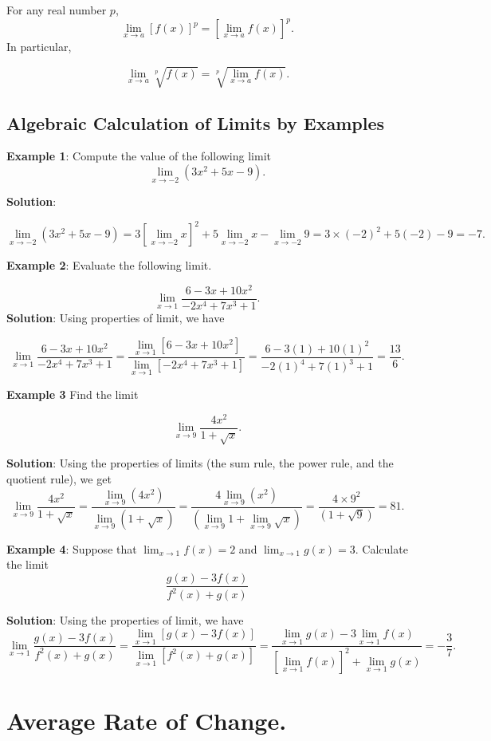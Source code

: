 \documentclass[
]{book}
\begin{document}
For any real number \(p\),
\[
\lim_{x\to a}[f(x)]^p = [\lim_{x\to a}f(x)]^p.
\]
In particular,

\[
\lim_{x\to a}\sqrt[p]{f(x)} = \sqrt[p]{\lim_{x\to a}f(x)}.
\]

\hypertarget{algebraic-calculation-of-limits-by-examples-2}{%
\subsection{Algebraic Calculation of Limits by Examples}\label{algebraic-calculation-of-limits-by-examples-2}}

\textbf{Example 1}: Compute the value of the following limit
\[
\lim_{x\to -2}(3x^2 + 5x -9).
\]

\textbf{Solution}:

\[
\lim_{x\to -2}(3x^2 + 5x -9) = 3[\lim_{x\to -2} x]^2 + 5\lim_{x\to -2}x - \lim_{x\to -2}9 = 3\times (-2)^2 + 5(-2) - 9 = -7.
\]

\textbf{Example 2}: Evaluate the following limit.

\[
\lim_{x\to 1}\frac{6-3x+10x^2}{-2x^4+7x^3+1}.
\]
\textbf{Solution}: Using properties of limit, we have

\[
\lim_{x\to 1}\frac{6-3x+10x^2}{-2x^4+7x^3+1}=\frac{\lim_{x\to 1}[6-3x+10x^2]}{\lim_{x\to 1}[-2x^4+7x^3+1]}=\frac{6-3(1)+10(1)^2}{-2(1)^4+7(1)^3+1}=\frac{13}{6}.
\]

\textbf{Example 3} Find the limit

\[
\lim_{x\to 9}\frac{4x^2}{1+\sqrt{x}}.
\]

\textbf{Solution}: Using the properties of limits (the sum rule, the power rule, and the quotient rule), we get \[
\lim_{x\to 9}\frac{4x^2}{1+\sqrt{x}}=\frac{\lim_{x\to 9}(4x^2)}{\lim_{x\to 9}(1+\sqrt{x})} = \frac{4\lim_{x\to 9}(x^2)}{(\lim_{x\to 9}1+\lim_{x\to 9}\sqrt{x})} = \frac{4\times 9^2}{(1+\sqrt{9})} = 81.
\]

\textbf{Example 4}: Suppose that \(\lim_{x\to 1}f(x) = 2\) and \(\lim_{x \to 1}g(x) = 3\). Calculate the limit
\[
 \frac{g(x) - 3f(x)}{f^2(x) + g(x)}
 \]

\textbf{Solution}: Using the properties of limit, we have
\[
\lim_{x\to 1} \frac{g(x) - 3f(x)}{f^2(x) + g(x)} =  \frac{\lim_{x\to 1}[g(x) - 3f(x)]}{\lim_{x\to 1}[f^2(x) + g(x)]} = \frac{\lim_{x\to 1}g(x) - 3\lim_{x\to 1}f(x)}{[\lim_{x\to 1}f(x)]^2 + \lim_{x\to 1}g(x)} = -\frac{3}{7}.
\]

\hfill\break

\hypertarget{average-rate-of-change.-2}{%
\section{Average Rate of Change.}\label{average-rate-of-change.-2}}
\end{document}
